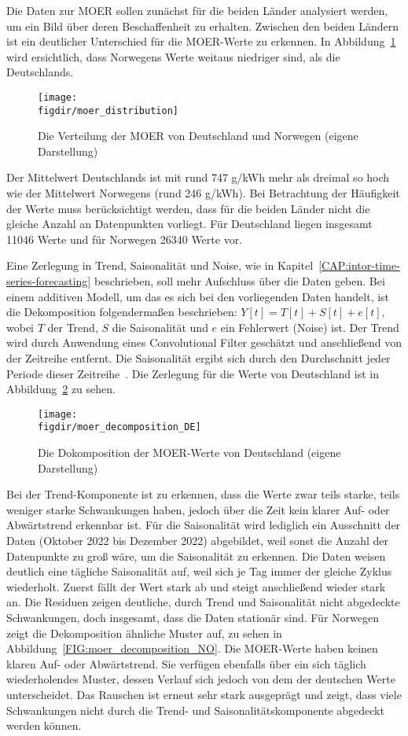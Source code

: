 Die Daten zur \ac{MOER} sollen zunächst für die beiden Länder analysiert werden, um ein Bild über deren Beschaffenheit zu erhalten.
Zwischen den beiden Ländern ist ein deutlicher Unterschied für die MOER-Werte zu erkennen.
In Abbildung~\ref{FIG:moer_distribution} wird ersichtlich, dass Norwegens Werte weitaus niedriger sind, als die Deutschlands.
\begin{figure}
 \caption[Verteilung MOER Deutschland und Norwegen]{Die Verteilung der MOER von Deutschland und Norwegen (eigene Darstellung)}
 {\texttt{[image: \\figdir/moer\_distribution]}}
 \label{FIG:moer_distribution}
\end{figure}
Der Mittelwert Deutschlands ist mit rund 747 g/\ac{kWh} mehr als dreimal so hoch wie der Mittelwert Norwegens (rund 246 g/\ac{kWh}).
Bei Betrachtung der Häufigkeit der Werte muss berücksichtigt werden, dass für die beiden Länder nicht die gleiche Anzahl an Datenpunkten vorliegt.
Für Deutschland liegen insgesamt 11046 Werte und für Norwegen 26340 Werte vor.

Eine Zerlegung in Trend, Saisonalität und Noise, wie in Kapitel~\ref{CAP:intor-time-series-forecasting} beschrieben, soll mehr Aufschluss über die Daten geben.
Bei einem additiven Modell, um das es sich bei den vorliegenden Daten handelt, ist die Dekomposition folgendermaßen beschrieben:
$Y[t] = T[t] + S[t] + e[t]$, wobei $T$ der Trend, $S$ die Saisonalität und $e$ ein Fehlerwert (Noise) ist.
Der Trend wird durch Anwendung eines Convolutional Filter geschätzt und anschließend von der Zeitreihe entfernt.
Die Saisonalität ergibt sich durch den Durchschnitt jeder Periode dieser Zeitreihe~\cite{JosefPerktold.2023}.
Die Zerlegung für die Werte von Deutschland ist in Abbildung~\ref{FIG:moer_decomposition_DE} zu sehen.
\begin{figure}
 \caption[Dekomposition der MOER Deutschlands]{Die Dokomposition der MOER-Werte von Deutschland (eigene Darstellung)}
 {\texttt{[image: \\figdir/moer\_decomposition\_DE]}}
 \label{FIG:moer_decomposition_DE}
\end{figure}
Bei der Trend-Komponente ist zu erkennen, dass die Werte zwar teils starke, teils weniger starke Schwankungen haben, jedoch über die Zeit kein klarer Auf- oder Abwärtstrend erkennbar ist.
Für die Saisonalität wird lediglich ein Ausschnitt der Daten (Oktober 2022 bis Dezember 2022) abgebildet, weil sonst die Anzahl der Datenpunkte zu groß wäre, um die Saisonalität zu erkennen.
Die Daten weisen deutlich eine tägliche Saisonalität auf, weil sich je Tag immer der gleiche Zyklus wiederholt.
Zuerst fällt der Wert stark ab und steigt anschließend wieder stark an.
Die Residuen zeigen deutliche, durch Trend und Saisonalität nicht abgedeckte Schwankungen, doch insgesamt, dass die Daten stationär sind.
Für Norwegen zeigt die Dekomposition  ähnliche Muster auf, zu sehen in Abbildung~\ref{FIG:moer_decomposition_NO}.
Die \ac{MOER}-Werte haben keinen klaren Auf- oder Abwärtstrend.
Sie verfügen ebenfalls über ein sich täglich wiederholendes Muster, dessen Verlauf sich jedoch von dem der deutschen Werte unterscheidet.
Das Rauschen ist erneut sehr stark ausgeprägt und zeigt, dass viele Schwankungen nicht durch die Trend- und Saisonalitätskomponente abgedeckt werden können.

